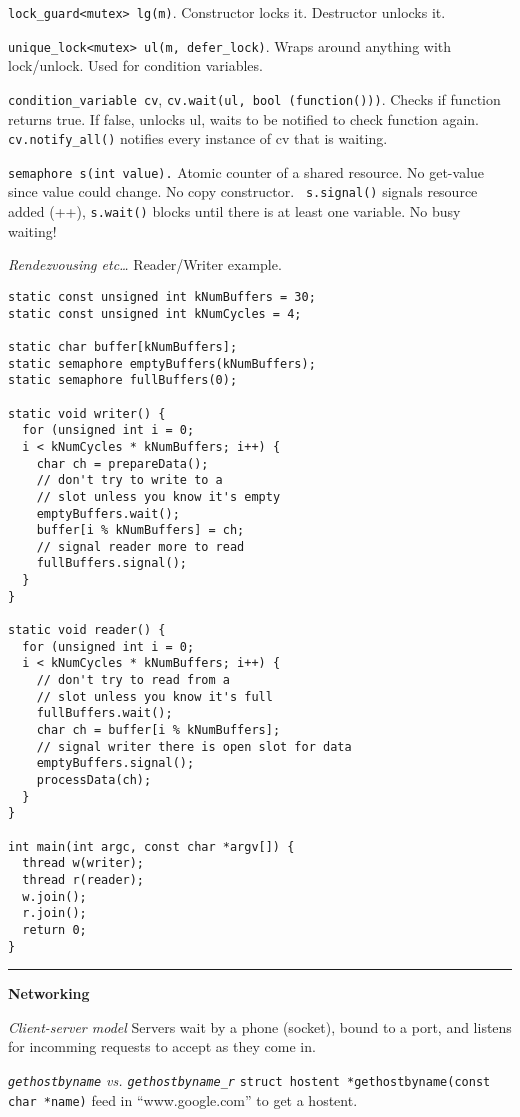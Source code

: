 \documentclass{article}
\begin{document}
\begin{multicols}{3}
  {\tt lock\_guard<mutex> lg(m)}. Constructor locks it. Destructor unlocks it.

  {\tt unique\_lock<mutex> ul(m, defer\_lock)}. Wraps around anything with
  lock/unlock. Used for condition variables.

  {\tt condition\_variable cv}, {\tt cv.wait(ul, bool (function()))}. Checks if
  function returns true. If false, unlocks ul, waits to be notified to check
  function again. {\tt cv.notify\_all()} notifies every instance of cv that is
  waiting.

  {\tt semaphore s(int value).} Atomic counter of a shared resource. No
  get-value since value could change. No copy constructor. {\tt
  s.signal()} signals resource added (++), {\tt s.wait()} blocks until there is
  at least one variable. No busy waiting!

  {\it Rendezvousing etc\ldots} Reader/Writer example.
  \begin{verbatim}
static const unsigned int kNumBuffers = 30;
static const unsigned int kNumCycles = 4;

static char buffer[kNumBuffers];
static semaphore emptyBuffers(kNumBuffers);
static semaphore fullBuffers(0);

static void writer() {
  for (unsigned int i = 0;
  i < kNumCycles * kNumBuffers; i++) {
    char ch = prepareData();
    // don't try to write to a
    // slot unless you know it's empty
    emptyBuffers.wait();
    buffer[i % kNumBuffers] = ch;
    // signal reader more to read
    fullBuffers.signal();
  }
}

static void reader() {
  for (unsigned int i = 0;
  i < kNumCycles * kNumBuffers; i++) {
    // don't try to read from a
    // slot unless you know it's full
    fullBuffers.wait();
    char ch = buffer[i % kNumBuffers];
    // signal writer there is open slot for data
    emptyBuffers.signal();
    processData(ch);
  }
}

int main(int argc, const char *argv[]) {
  thread w(writer);
  thread r(reader);
  w.join();
  r.join();
  return 0;
}
  \end{verbatim}

  \noindent\rule{4cm}{0.4pt}

  {\bf Networking}

  {\it Client-server model} Servers wait by a phone (socket), bound to a port,
  and listens for incomming requests to accept as they come in.

  {\it {\tt gethostbyname} vs. {\tt gethostbyname\_r}}
  {\tt struct hostent *gethostbyname(const char *name)} feed in
  ``www.google.com'' to get a hostent. %


\end{multicols}
\end{document}
